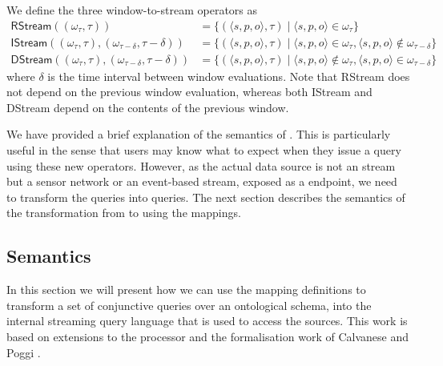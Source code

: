 We define the three window-to-stream operators as
\begin{align*}
  \textsf{RStream}((\omega_\tau, \tau)) &= \{(\langle s, p, o \rangle, \tau) \mid \langle s, p, o \rangle \in \omega_\tau\}\\
%
  \textsf{IStream}((\omega_\tau, \tau), (\omega_{\tau-\delta}, \tau - \delta)) &= \{(\langle s, p, o \rangle, \tau) \mid \langle s, p, o \rangle \in \omega_\tau, \langle s, p, o \rangle \notin \omega_{\tau-\delta}\}\\
%
  \textsf{DStream}((\omega_\tau, \tau), (\omega_{\tau-\delta}, \tau - \delta)) &= \{(\langle s, p, o \rangle, \tau) \mid \langle s, p, o \rangle \notin \omega_\tau, \langle s, p, o \rangle \in \omega_{\tau-\delta}\}
\end{align*}
where $\delta$ is the time interval between window evaluations.
Note that \textsf{RStream} does not depend on the previous window evaluation, whereas both \textsf{IStream} and \textsf{DStream} depend on the contents of the previous window.

We have provided a brief explanation of the semantics of \sparqlstr. 
This is particularly useful in the sense that users may know what to expect when they issue a query using these new operators. 
However, as the actual data source is not an \rdf stream but a sensor network or an event-based stream, \eg exposed as a \sneeql endpoint, we need to transform the \sparqlstr queries into \sneeql queries.
The next section describes the semantics of the transformation from \sparqlstr to \sneeql using the \stwoo mappings.


\subsection{\stwoo Semantics}
\label{mappingsemantics}

In this section we will present how we can use the mapping definitions to transform a set of conjunctive queries over an ontological schema, into the internal streaming query language \sneeql that is used to access the sources. 
This work is based on extensions to the \odemapster processor \cite{Barrasa_04} and the
formalisation work of Calvanese \etal \cite{Calvanese_05} and Poggi \etal \cite{Poggi_08}.

